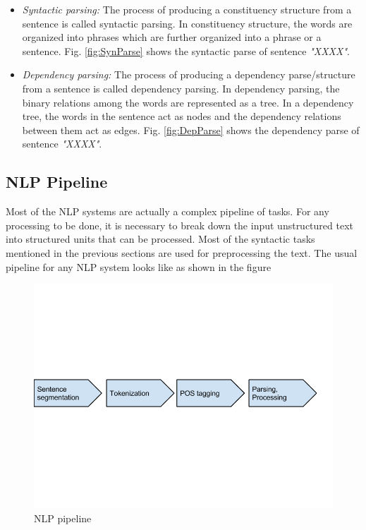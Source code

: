 \begin{itemize}

\item \textit{Syntactic parsing:} The process of producing a constituency structure from a sentence is called syntactic parsing. In constituency structure, the words are organized into phrases which are further organized into a phrase or a sentence. Fig. \ref{fig:SynParse} shows the syntactic parse of sentence \textit{"XXXX"}.

\item \textit{Dependency parsing:} The process of producing a dependency parse/structure from a sentence is called dependency parsing. In dependency parsing, the binary relations among the words are represented as a tree. In a dependency tree, the words in the sentence act as nodes and the dependency relations between them act as edges. Fig. \ref{fig:DepParse} shows the dependency parse of sentence \textit{"XXXX"}.

\end{itemize}

\subsection{NLP Pipeline}

Most of the NLP systems are actually a complex pipeline of tasks. For any processing to be done, it is necessary to break down the input unstructured text into structured units that can be processed. Most of the syntactic tasks mentioned in the previous sections are used for preprocessing the text. The usual pipeline for any NLP system looks like as shown in the figure

\begin{figure}
\centering
\includegraphics[scale=0.4]{figures/NLPPipeline.png}
\caption{NLP pipeline}\label{fig:NLPPipe}
\end{figure}

